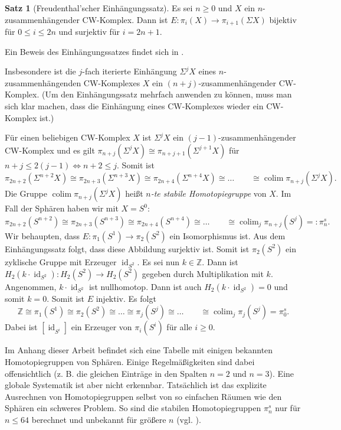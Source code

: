 \documentclass[11pt, a4paper, german]{article}
\theoremstyle{definition}
\newtheorem{satz}[lem]{Satz}
\theoremstyle{remark}
\newcommand{\Z}{\mathbb{Z}} %
\DeclareMathOperator{\id}{id} %
\DeclareMathOperator{\colim}{colim} %
\begin{document}
\begin{satz}[Freudenthal'scher Einhängungssatz]
  Es sei $n \geq 0$ und $X$ ein $n$-zusammenhängender CW-Komplex.
  Dann ist $E : \pi_i(X) \to \pi_{i+1}(\Sigma X)$ bijektiv für $0 \leq i \leq 2n$ und surjektiv für $i = 2n + 1$.
\end{satz}

Ein Beweis des Einhängungssatzes findet sich in \cite[\mbox{}4.24]{hatcher:at}.

Insbesondere ist die $j$-fach iterierte Einhängung $\Sigma^j X$ eines $n$-zusammenhängenden CW-Komplexes $X$ ein $(n{+}j)$-zusammenhängender CW-Komplex. (Um den Einhängungssatz mehrfach anwenden zu können, muss man sich klar machen, dass die Einhängung eines CW-Komplexes wieder ein CW-Komplex ist.)

Für einen beliebigen CW-Komplex $X$ ist $\Sigma^j X$ ein $(j{-}1)$-zusammenhängender CW-Komplex und es gilt $\pi_{n+j}(\Sigma^j X) \cong \pi_{n+j+1}(\Sigma^{j+1} X)$ für $n + j \leq 2(j-1) \Leftrightarrow n+2 \leq j$.
Somit ist
\[ \pi_{2n+2}(\Sigma^{n+2} X) \cong \pi_{2n+3}(\Sigma^{n+3} X) \cong \pi_{2n+4}(\Sigma^{n+4} X) \cong \ldots \qquad \cong \colim \pi_{n+j}(\Sigma^j X). \]
Die Gruppe $\colim \pi_{n+j}(\Sigma^j X)$ heißt \emph{$n$-te stabile Homotopiegruppe} von $X$.
Im Fall der Sphären haben wir mit $X = S^0$:
\[ \pi_{2n+2}(S^{n+2}) \cong \pi_{2n+3}(S^{n+3}) \cong \pi_{2n+4}(S^{n+4}) \cong \ldots \qquad \cong \colim_j \pi_{n+j}(S^j) =: \pi^s_n. \]
Wir behaupten, dass $E : \pi_1(S^1) \to \pi_2(S^2)$ ein Isomorphismus ist.
Aus dem Einhängungssatz folgt, dass diese Abbildung surjektiv ist.
Somit ist $\pi_2(S^2)$ ein zyklische Gruppe mit Erzeuger $\id_{S^2}$.
Es sei nun $k \in \Z$.
Dann ist $H_2(k \cdot \id_{S^2}) : H_2(S^2) \to H_2(S^2)$ gegeben durch Multiplikation mit $k$.
Angenommen, $k \cdot \id_{S^2}$ ist nullhomotop.
Dann ist auch $H_2(k \cdot \id_{S^2}) = 0$ und somit $k = 0$.
Somit ist $E$ injektiv.
Es folgt
\[ \Z \cong \pi_1(S^1) \cong \pi_2(S^2) \cong \ldots \cong \pi_j(S^j)  \cong \ldots \qquad \cong \colim_j \pi_j(S^j) = \pi^s_0. \]
Dabei ist $[\id_{S^i}]$ ein Erzeuger von $\pi_i(S^i)$ für alle $i \geq 0$.

Im Anhang dieser Arbeit befindet sich eine Tabelle mit einigen bekannten Homotopiegruppen von Sphären.
Einige Regelmäßigkeiten sind dabei offensichtlich (z. B. die gleichen Einträge in den Spalten $n{=}2$ und $n{=}3$).
Eine globale Systematik ist aber nicht erkennbar.
Tatsächlich ist das explizite Ausrechnen von Homotopiegruppen selbst von so einfachen Räumen wie den Sphären ein schweres Problem.
So sind die stabilen Homotopiegruppen $\pi_n^s$ nur für $n \leq 64$ berechnet und unbekannt für größere $n$ (vgl. \cite[384]{hatcher:at}).
\end{document}
